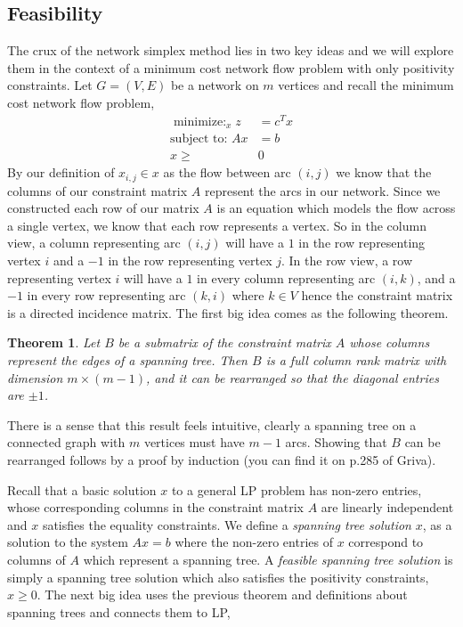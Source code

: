 \documentclass[12pt]{amsart}
\newtheorem{theorem}{Theorem}
\begin{document}
\subsection{Feasibility}
The crux of the network simplex method lies in two key ideas and we will explore them in the context of a 
minimum cost network flow problem with only positivity constraints. Let $G = (V, E)$ be a network on $m$ vertices and recall the minimum cost network flow problem, 
\begin{align*}
    \mathop{\text{minimize: }}_{x}  z &= c^Tx\\
  \text{subject to: }Ax &= b\\
  x \geq& 0
\end{align*}
By our definition of $x_{i, j} \in x$ as the flow between arc $(i, j)$ we know that the columns of our constraint matrix $A$ represent 
the arcs in our network. Since we constructed each row of our matrix $A$ is an equation which models the flow across a single vertex, we know that each row represents a vertex. So in the column view, a column representing arc $(i, j)$ will have a $1$ in the row representing vertex $i$ and a $-1$ in the row representing 
vertex $j$. In the row view, a row representing vertex $i$ will have a $1$ in every column representing arc $(i, k)$, and a $-1$ in every row representing arc $(k, i)$ where 
$k \in V$ hence the constraint matrix is a directed incidence matrix. The first big idea comes as the following theorem.
\begin{theorem} Let $B$ be a submatrix of the constraint matrix $A$ whose columns represent the edges of a spanning tree.
    Then $B$ is a full column rank matrix with dimension $m \times (m - 1)$, and it can be rearranged so that the diagonal entries are $\pm 1$. 
\end{theorem}

There is a sense that this result feels intuitive, clearly a spanning tree on a connected graph with $m$ vertices must have $m - 1$ arcs. Showing that 
$B$ can be rearranged follows by a proof by induction (you can find it on p.285 of Griva). 


Recall that a basic solution $x$ to a general LP problem has non-zero entries, whose corresponding columns in the constraint matrix $A$ are linearly independent
and $x$ satisfies the equality constraints. We define a \emph{spanning tree solution} $x$, as a solution to the system $Ax = b$ where the non-zero entries of $x$
correspond to columns of $A$ which represent a spanning tree. A \emph{feasible spanning tree solution} is simply a spanning tree solution which also satisfies the 
positivity constraints, $x \geq 0$. The next big idea uses the previous theorem and definitions about spanning trees and connects them to LP, 
  
\end{document}
